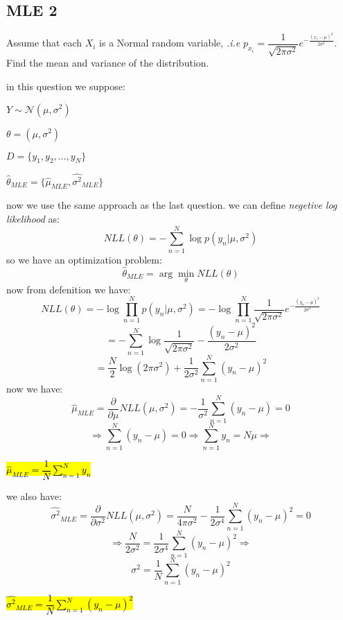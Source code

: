 \subsection{MLE 2}
Assume that each $X_i$ is a Normal random variable, \textit{.i.e} $p_{x_i} = \dfrac{1}{\sqrt{2\pi\sigma^2}} e^{-\frac{(x_i-\mu)^2}{2\sigma^2}}$. Find the mean and variance of the distribution.
\begin{qsolve}
	\begin{qsolve}[]
		in this question we suppose:
		\begin{mylist}
			\item $Y \sim \mathcal{N}(\mu , \sigma^2)$
			\item $\theta = (\mu , \sigma^2)$
			\item $D = \{y_1, y_2, ..., y_N\}$
			\item $\hat{\theta}_{MLE} =\{\hat{\mu}_{MLE}, \hat{\sigma^2}_{MLE}\}$
		\end{mylist}
		now we use the same approach as the last question. we can define \textit{negetive log likelihood} as:
		$$NLL(\theta) = -\sum_{n=1}^{N} \log p(y_n|\mu, \sigma^2)$$
		so we have an optimization problem:
		$$\hat{\theta}_{MLE} = \arg \min_{\theta} NLL(\theta)$$
		now from defenition we have:
		$$NLL(\theta) = -\log \prod_{n=1}^{N} p(y_n|\mu, \sigma^2) = -\log \prod_{n=1}^{N} \dfrac{1}{\sqrt{2\pi\sigma^2}} e^{-\frac{(y_n-\mu)^2}{2\sigma^2}}$$
		$$= -\sum_{n=1}^{N} \log \dfrac{1}{\sqrt{2\pi\sigma^2}} - \dfrac{(y_n-\mu)^2}{2\sigma^2}$$
		$$ = \dfrac{N}{2}\log(2\pi \sigma^2) + \dfrac{1}{2\sigma^2} \sum_{n=1}^{N} (y_n-\mu)^2$$
		now we have:
		$$\hat{\mu}_{MLE} = \dfrac{\partial}{\partial \mu} NLL(\mu, \sigma^2) = -\dfrac{1}{\sigma^2} \sum_{n=1}^{N} (y_n-\mu) = 0$$
		$$\Rightarrow \sum_{n=1}^{N} (y_n-\mu) = 0 \Rightarrow \sum_{n=1}^{N} y_n = N\mu \Rightarrow$$
		\begin{center}
			\hl{$\hat{\mu}_{MLE} = \dfrac{1}{N} \sum_{n=1}^{N} y_n$}
		\end{center}
		we also have:
		$$\hat{\sigma^2}_{MLE} = \dfrac{\partial}{\partial \sigma^2} NLL(\mu, \sigma^2) = \dfrac{N}{4\pi \sigma^2} - \dfrac{1}{2\sigma^4} \sum_{n=1}^{N} (y_n-\mu)^2 = 0$$
		\splitqsolve[\splitqsolve]
		$$\Rightarrow \dfrac{N}{2 \sigma^2} = \dfrac{1}{2\sigma^4} \sum_{n=1}^{N} (y_n-\mu)^2 \Rightarrow$$
		$$\sigma^2 = \dfrac{1}{N} \sum_{n=1}^{N} (y_n-\mu)^2$$
		\begin{center}
			\hl{$\hat{\sigma^2}_{MLE} = \dfrac{1}{N} \sum_{n=1}^{N} (y_n-\mu)^2$}
		\end{center}
	\end{qsolve}
\end{qsolve}
